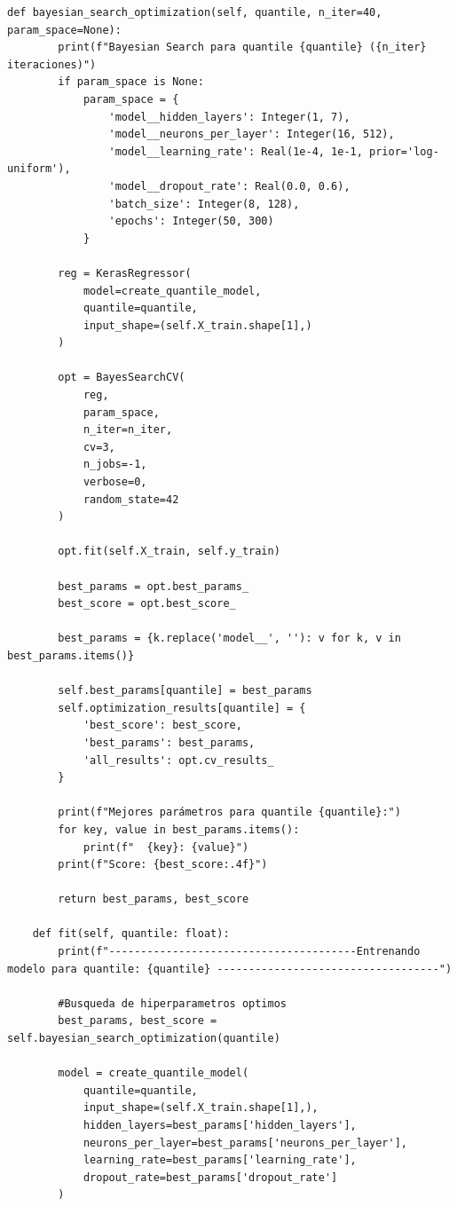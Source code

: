 \documentclass[11pt]{book}
\theoremstyle{plain} %
\theoremstyle{definition} %
\begin{document}
\begin{lstlisting}[style=pythonstyle, caption=neuralnetwork.py]
    def bayesian_search_optimization(self, quantile, n_iter=40, param_space=None):
        print(f"Bayesian Search para quantile {quantile} ({n_iter} iteraciones)")
        if param_space is None:
            param_space = {
                'model__hidden_layers': Integer(1, 7),
                'model__neurons_per_layer': Integer(16, 512),
                'model__learning_rate': Real(1e-4, 1e-1, prior='log-uniform'),
                'model__dropout_rate': Real(0.0, 0.6),
                'batch_size': Integer(8, 128),
                'epochs': Integer(50, 300)
            }
        
        reg = KerasRegressor(
            model=create_quantile_model,
            quantile=quantile,
            input_shape=(self.X_train.shape[1],)
        )

        opt = BayesSearchCV(
            reg,
            param_space,
            n_iter=n_iter,
            cv=3,
            n_jobs=-1,
            verbose=0,
            random_state=42
        )

        opt.fit(self.X_train, self.y_train)

        best_params = opt.best_params_
        best_score = opt.best_score_
        
        best_params = {k.replace('model__', ''): v for k, v in best_params.items()}

        self.best_params[quantile] = best_params
        self.optimization_results[quantile] = {
            'best_score': best_score,
            'best_params': best_params,
            'all_results': opt.cv_results_
        }
        
        print(f"Mejores parámetros para quantile {quantile}:")
        for key, value in best_params.items():
            print(f"  {key}: {value}")
        print(f"Score: {best_score:.4f}")
        
        return best_params, best_score

    def fit(self, quantile: float):
        print(f"---------------------------------------Entrenando modelo para quantile: {quantile} -----------------------------------")
        
        #Busqueda de hiperparametros optimos
        best_params, best_score = self.bayesian_search_optimization(quantile)
        
        model = create_quantile_model(
            quantile=quantile,
            input_shape=(self.X_train.shape[1],),
            hidden_layers=best_params['hidden_layers'],
            neurons_per_layer=best_params['neurons_per_layer'],
            learning_rate=best_params['learning_rate'],
            dropout_rate=best_params['dropout_rate']
        )


\end{lstlisting}
\end{document}
